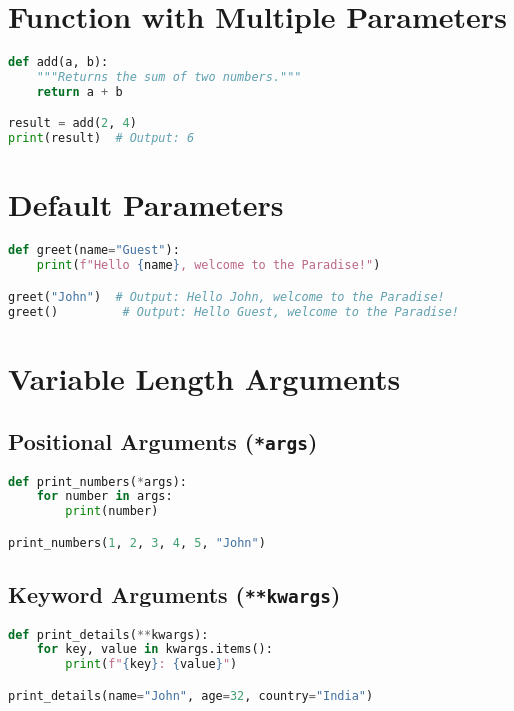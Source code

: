 \section{Function with Multiple Parameters}

\begin{lstlisting}[language=Python]
def add(a, b):
    """Returns the sum of two numbers."""
    return a + b

result = add(2, 4)
print(result)  # Output: 6
\end{lstlisting}

\section{Default Parameters}

\begin{lstlisting}[language=Python]
def greet(name="Guest"):
    print(f"Hello {name}, welcome to the Paradise!")

greet("John")  # Output: Hello John, welcome to the Paradise!
greet()         # Output: Hello Guest, welcome to the Paradise!
\end{lstlisting}

\section{Variable Length Arguments}

\subsection{Positional Arguments (\texttt{*args})}

\begin{lstlisting}[language=Python]
def print_numbers(*args):
    for number in args:
        print(number)

print_numbers(1, 2, 3, 4, 5, "John")
\end{lstlisting}

\subsection{Keyword Arguments (\texttt{**kwargs})}

\begin{lstlisting}[language=Python]
def print_details(**kwargs):
    for key, value in kwargs.items():
        print(f"{key}: {value}")

print_details(name="John", age=32, country="India")
\end{lstlisting}

